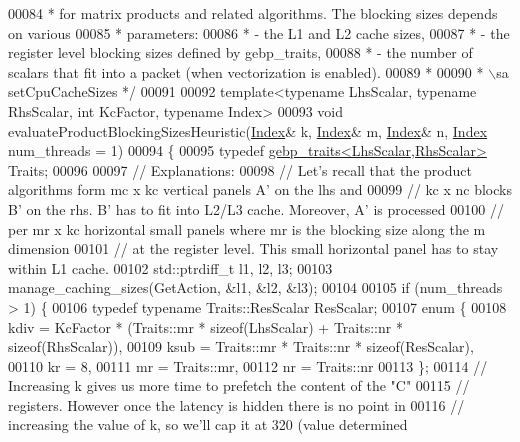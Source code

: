 \begin{DoxyCode}
00084 \textcolor{comment}{ * for matrix products and related algorithms. The blocking sizes depends on various}
00085 \textcolor{comment}{ * parameters:}
00086 \textcolor{comment}{ * - the L1 and L2 cache sizes,}
00087 \textcolor{comment}{ * - the register level blocking sizes defined by gebp\_traits,}
00088 \textcolor{comment}{ * - the number of scalars that fit into a packet (when vectorization is enabled).}
00089 \textcolor{comment}{ *}
00090 \textcolor{comment}{ * \(\backslash\)sa setCpuCacheSizes */}
00091 
00092 \textcolor{keyword}{template}<\textcolor{keyword}{typename} LhsScalar, \textcolor{keyword}{typename} RhsScalar, \textcolor{keywordtype}{int} KcFactor, \textcolor{keyword}{typename} Index>
00093 \textcolor{keywordtype}{void} evaluateProductBlockingSizesHeuristic(\hyperlink{namespace_eigen_a62e77e0933482dafde8fe197d9a2cfde}{Index}& k, \hyperlink{namespace_eigen_a62e77e0933482dafde8fe197d9a2cfde}{Index}& m, \hyperlink{namespace_eigen_a62e77e0933482dafde8fe197d9a2cfde}{Index}& n, 
      \hyperlink{namespace_eigen_a62e77e0933482dafde8fe197d9a2cfde}{Index} num\_threads = 1)
00094 \{
00095   \textcolor{keyword}{typedef} \hyperlink{class_eigen_1_1internal_1_1gebp__traits}{gebp\_traits<LhsScalar,RhsScalar>} Traits;
00096 
00097   \textcolor{comment}{// Explanations:}
00098   \textcolor{comment}{// Let's recall that the product algorithms form mc x kc vertical panels A' on the lhs and}
00099   \textcolor{comment}{// kc x nc blocks B' on the rhs. B' has to fit into L2/L3 cache. Moreover, A' is processed}
00100   \textcolor{comment}{// per mr x kc horizontal small panels where mr is the blocking size along the m dimension}
00101   \textcolor{comment}{// at the register level. This small horizontal panel has to stay within L1 cache.}
00102   std::ptrdiff\_t l1, l2, l3;
00103   manage\_caching\_sizes(GetAction, &l1, &l2, &l3);
00104 
00105   \textcolor{keywordflow}{if} (num\_threads > 1) \{
00106     \textcolor{keyword}{typedef} \textcolor{keyword}{typename} Traits::ResScalar ResScalar;
00107     \textcolor{keyword}{enum} \{
00108       kdiv = KcFactor * (Traits::mr * \textcolor{keyword}{sizeof}(LhsScalar) + Traits::nr * \textcolor{keyword}{sizeof}(RhsScalar)),
00109       ksub = Traits::mr * Traits::nr * \textcolor{keyword}{sizeof}(ResScalar),
00110       kr = 8,
00111       mr = Traits::mr,
00112       nr = Traits::nr
00113     \};
00114     \textcolor{comment}{// Increasing k gives us more time to prefetch the content of the "C"}
00115     \textcolor{comment}{// registers. However once the latency is hidden there is no point in}
00116     \textcolor{comment}{// increasing the value of k, so we'll cap it at 320 (value determined}

\end{DoxyCode}

